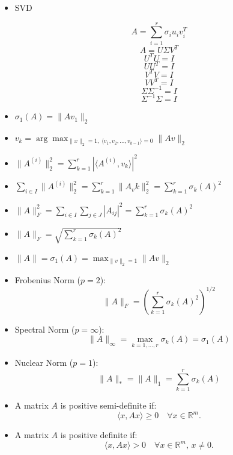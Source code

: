 \documentclass{article}
\begin{document}
\begin{itemize}

\item SVD

\[
A = \sum_{i=1}^r \sigma_i u_i v_i^T
\]
\[
A = U \Sigma V^T
\]
\[
U^T U = I
\]
\[
U U^T = I
\]
\[
V^T V = I
\]
\[
V V^T = I
\]
\[
\Sigma \Sigma^{-1} = I
\]
\[
\Sigma^{-1} \Sigma = I
\]

\item 
$
\sigma_1(A) = \|Av_1\|_2
$


\item 
$
v_k = \arg \max_{\|x\|_2=1,\; \langle v_1,v_2,\ldots,v_{k-1} \rangle=0} \|Av\|_2
$

\item    $
    \| A^{(i)} \|_2^2 = \sum_{k=1}^{r} | \langle A^{(i)}, v_k \rangle |^2
    $

\item 
$
    \sum_{i \in I} \| A^{(i)} \|_2^2 = \sum_{k=1}^{r} \| A_v k \|_2^2 = \sum_{k=1}^{r} \sigma_k(A)^2
$

\item
   $
    \| A \|_F^2 = \sum_{i \in I} \sum_{j \in J} | A_{ij} |^2 = \sum_{k=1}^{r} \sigma_k(A)^2
  $

\item 
    $
    \| A \|_F = \sqrt{ \sum_{k=1}^{r} \sigma_k(A)^2 }
   $

\item 
$
\|A\| = \sigma_1(A) = \max_{\|v\|_2=1} \|Av\|_2
$

\item Frobenius Norm ($p = 2$):
        \[
        \|A\|_F = \left( \sum_{k=1}^r \sigma_k(A)^2 \right)^{1/2}
        \]

        \item Spectral Norm ($p = \infty$):
        \[
        \|A\|_\infty = \max_{k=1,\ldots,r} \sigma_k(A) = \sigma_1(A)
        \]

        \item Nuclear Norm ($p = 1$):
        \[
        \|A\|_* = \|A\|_1 = \sum_{k=1}^r \sigma_k(A)
        \]

\item A matrix $A$ is positive semi-definite if:
        \[
        \langle x, Ax \rangle \geq 0 \quad \forall x \in \mathbb{R}^m.
        \]

 \item A matrix $A$ is positive definite if:
        \[
        \langle x, Ax \rangle > 0 \quad \forall x \in \mathbb{R}^m, \, x \neq 0.
        \]




\end{itemize}
\end{document}

